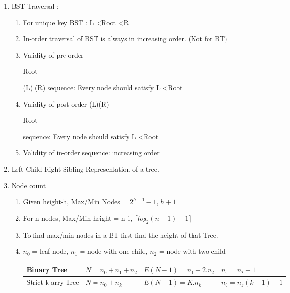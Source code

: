 \begin{enumerate}
    \item BST Traversal :
    \begin{enumerate}
        \item For unique key BST :  L \textless Root \textless R
        \item In-order traversal of BST is always in increasing order. (Not for BT)
        \item Validity of pre-order \begin{hl}{Root}\end{hl}(L) (R) sequence: Every node should satisfy L \textless Root
        \item Validity of post-order (L)(R)\begin{hl}{Root}\end{hl} sequence: Every node should satisfy L \textless Root
        \item Validity of in-order sequence:  increasing order
    \end{enumerate}

    \item Left-Child Right Sibling Representation of a tree.

    \item Node count
    \begin{enumerate}
        \item Given height-h, Max/Min Nodes = \( 2^{h+1} - 1\), \( h + 1\)
        \item For n-nodes, Max/Min height = n-1, \(\lceil log_2{(n+1)} - 1 \rceil \)
        \item To find max/min nodes in a BT first find the height of that Tree.
        \item \(n_0\) = leaf node, \(n_1\) = node with one child, \(n_2\) = node with two child

  \vspace{0.08in}
  \begin{myTableStyle} \begin{tabular}{ |m{3cm}|m{3cm}|m{4cm}|m{3cm}| } \hline
          Binary Tree & \( N= n_0 + n_1 + n_2 \)  &  \( E(N-1) =  n_1 + 2.n_2 \) &  \( n_0 =  n_2 + 1 \)  \\ \hline
          Strict k-arry Tree & \( N= n_0 + n_k \)  &  \( E(N-1) = K.n_k \) &  \( n_0 =  n_k(k-1) + 1 \)  \\ \hline
  \end{tabular} \end{myTableStyle} \vspace{0.08in}
    \end{enumerate}


\end{enumerate}
